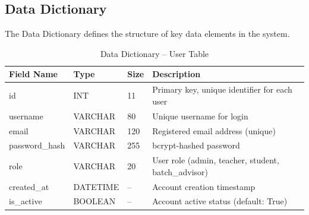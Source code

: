 \subsection{Data Dictionary}

The Data Dictionary defines the structure of key data elements in the system.

\begin{table}[H]
\centering
\caption{Data Dictionary -- User Table}
\begin{tabularx}{\textwidth}{|p{3cm}|p{2cm}|p{2cm}|X|}
\hline
\textbf{Field Name} & \textbf{Type} & \textbf{Size} & \textbf{Description} \\
\hline
id & INT & 11 & Primary key, unique identifier for each user \\
\hline
username & VARCHAR & 80 & Unique username for login \\
\hline
email & VARCHAR & 120 & Registered email address (unique) \\
\hline
password\_hash & VARCHAR & 255 & bcrypt-hashed password \\
\hline
role & VARCHAR & 20 & User role (admin, teacher, student, batch\_advisor) \\
\hline
created\_at & DATETIME & -- & Account creation timestamp \\
\hline
is\_active & BOOLEAN & -- & Account active status (default: True) \\
\hline
\end{tabularx}
\end{table}

